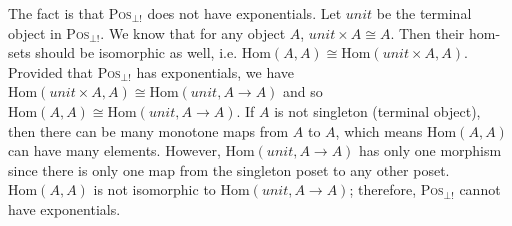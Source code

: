 \begin{myitemize}
The fact is that \textsc{Pos}$_{\bot !}$ does not have exponentials. Let $ unit $ be the terminal object in \textsc{Pos}$_{\bot !}$. We know that for any object $ A $, $ unit \times A \cong A $. Then their hom-sets should be isomorphic as well, i.e. $ \text{Hom}(A,A) \cong \text{Hom}(unit \times A,A) $. Provided that \textsc{Pos}$_{\bot !}$ has exponentials, we have $ \text{Hom}(unit \times A,A) \cong \text{Hom}(unit, A \to A) $ and so $ \text{Hom}(A,A) \cong \text{Hom}(unit, A \to A) $. If $ A $ is not singleton (terminal object), then there can be many monotone maps from $ A $ to $ A $, which means $ \text{Hom}(A,A) $ can have many elements. However, $ \text{Hom}(unit, A \to A) $ has only one morphism since there is only one map from the singleton poset to any other poset. $ \text{Hom}(A,A) $ is not isomorphic to  $ \text{Hom}(unit, A \to A) $; therefore, \textsc{Pos}$_{\bot !}$ cannot have exponentials.

\end{myitemize}